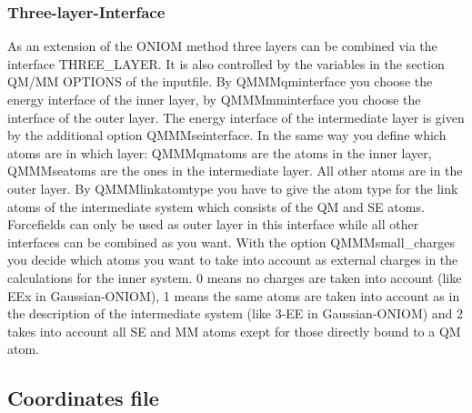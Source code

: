 \documentclass[10pt,a4paper]{article} %
\begin{document}
\subsubsection{Three-layer-Interface}

As an extension of the ONIOM method three layers can be combined via the interface THREE\_LAYER. It is also controlled by the variables in the section QM/MM OPTIONS of the inputfile. By QMMMqminterface you choose the energy interface of the inner layer, by QMMMmminterface you choose the interface of the outer layer. The energy interface of the intermediate layer is given by the additional option QMMMseinterface. In the same way you define which atoms are in which layer: QMMMqmatoms are the atoms in the inner layer, QMMMseatoms are the ones in the intermediate layer. All other atoms are in the outer layer. By QMMMlinkatomtype you have to give the atom type for the link atoms of the intermediate system which consists of the QM and SE atoms. Forcefields can only be used as outer layer in this interface while all other interfaces can be combined as you want. With the option QMMMsmall\_charges you decide which atoms you want to take into account as external charges in the calculations for the inner system. 0 means no charges are taken into account (like EEx in Gaussian-ONIOM), 1 means the same atoms are taken into account as in the description of the intermediate system (like 3-EE in Gaussian-ONIOM) and 2 takes into account all SE and MM atoms exept for those directly bound to a QM atom.
			
	\subsection{Coordinates file}
	
\end{document}
